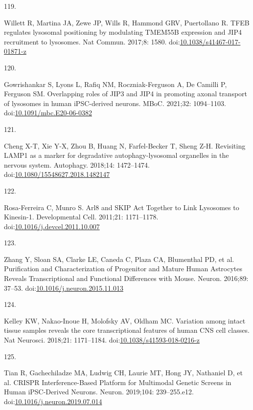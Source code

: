 \documentclass[
  12pt,
  a4paper,
]{book}
\newlength{\cslhangindent}
\newlength{\csllabelwidth}
\newenvironment{CSLReferences}[2] %
 {\begin{list}{}{%
  \setlength{\itemindent}{0pt}
  \setlength{\leftmargin}{0pt}
  \setlength{\parsep}{0pt}
  \ifodd #1
   \setlength{\leftmargin}{\cslhangindent}
   \setlength{\itemindent}{-1\cslhangindent}
  \fi
  \setlength{\itemsep}{#2\baselineskip}}}
 {\end{list}}
\newcommand{\CSLLeftMargin}[1]{\parbox[t]{\csllabelwidth}{\strut#1\strut}}
\newcommand{\CSLRightInline}[1]{\parbox[t]{\linewidth - \csllabelwidth}{\strut#1\strut}}
\begin{document}
\begin{CSLReferences}{0}{1}
\CSLLeftMargin{119. }%
\CSLRightInline{Willett R, Martina JA, Zewe JP, Wills R, Hammond GRV, Puertollano R. {TFEB} regulates lysosomal positioning by modulating {TMEM55B} expression and {JIP4} recruitment to lysosomes. Nat Commun. 2017;8: 1580. doi:\href{https://doi.org/10.1038/s41467-017-01871-z}{10.1038/s41467-017-01871-z}}

\CSLLeftMargin{120. }%
\CSLRightInline{Gowrishankar S, Lyons L, Rafiq NM, Roczniak-Ferguson A, De Camilli P, Ferguson SM. Overlapping roles of {JIP3} and {JIP4} in promoting axonal transport of lysosomes in human {iPSC-derived} neurons. MBoC. 2021;32: 1094--1103. doi:\href{https://doi.org/10.1091/mbc.E20-06-0382}{10.1091/mbc.E20-06-0382}}

\CSLLeftMargin{121. }%
\CSLRightInline{Cheng X-T, Xie Y-X, Zhou B, Huang N, Farfel-Becker T, Sheng Z-H. Revisiting {LAMP1} as a marker for degradative autophagy-lysosomal organelles in the nervous system. Autophagy. 2018;14: 1472--1474. doi:\href{https://doi.org/10.1080/15548627.2018.1482147}{10.1080/15548627.2018.1482147}}

\CSLLeftMargin{122. }%
\CSLRightInline{Rosa-Ferreira C, Munro S. Arl8 and {SKIP Act Together} to {Link Lysosomes} to {Kinesin-1}. Developmental Cell. 2011;21: 1171--1178. doi:\href{https://doi.org/10.1016/j.devcel.2011.10.007}{10.1016/j.devcel.2011.10.007}}

\CSLLeftMargin{123. }%
\CSLRightInline{Zhang Y, Sloan SA, Clarke LE, Caneda C, Plaza CA, Blumenthal PD, et al. Purification and {Characterization} of {Progenitor} and {Mature Human Astrocytes Reveals Transcriptional} and {Functional Differences} with {Mouse}. Neuron. 2016;89: 37--53. doi:\href{https://doi.org/10.1016/j.neuron.2015.11.013}{10.1016/j.neuron.2015.11.013}}

\CSLLeftMargin{124. }%
\CSLRightInline{Kelley KW, Nakao-Inoue H, Molofsky AV, Oldham MC. Variation among intact tissue samples reveals the core transcriptional features of human {CNS} cell classes. Nat Neurosci. 2018;21: 1171--1184. doi:\href{https://doi.org/10.1038/s41593-018-0216-z}{10.1038/s41593-018-0216-z}}

\CSLLeftMargin{125. }%
\CSLRightInline{Tian R, Gachechiladze MA, Ludwig CH, Laurie MT, Hong JY, Nathaniel D, et al. {CRISPR Interference-Based Platform} for {Multimodal Genetic Screens} in {Human iPSC-Derived Neurons}. Neuron. 2019;104: 239--255.e12. doi:\href{https://doi.org/10.1016/j.neuron.2019.07.014}{10.1016/j.neuron.2019.07.014}}


\end{CSLReferences}
\end{document}
